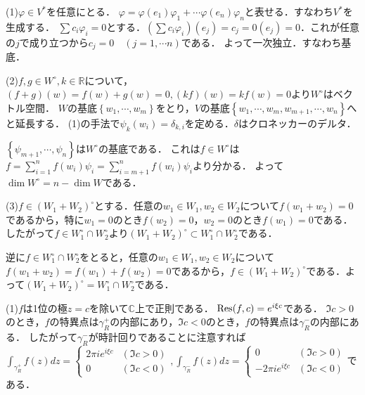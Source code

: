 \documentclass[
		book,
		head_space=20mm,
		foot_space=20mm,
		gutter=10mm,
		line_length=190mm
]{jlreq}
\begin{document}
(1)$\varphi\in V^*$を任意にとる．
$\varphi=\varphi(e_1)\varphi_1+\cdots \varphi(e_n)\varphi_n$と表せる．すなわち$V^*$を生成する．
$\sum c_i \varphi_i=0$とする．$(\sum c_i\varphi_i)(e_j)=c_j=0(e_j)=0$．これが任意の$j$で成り立つから$c_j=0\quad(j=1,\cdots n)$である．
よって一次独立．すなわち基底．

(2)$f,g\in W^{\circ},k\in \mathbb{R}$について，$(f+g)(w)=f(w)+g(w)=0,(kf)(w)=kf(w)=0$より$W^{\circ}$はベクトル空間．
$W$の基底$\left\{ w_1,\cdots,w_m \right\}$をとり，$V$の基底$\left\{ w_1,\cdots,w_m,w_{m+1},\cdots,w_n \right\}$へと延長する．
(1)の手法で$\psi_k(w_i)=\delta_{k,i}$を定める．$\delta$はクロネッカーのデルタ．

$\left\{ \psi_{m+1},\cdots,\psi_n \right\}$は$W^{\circ}$の基底である．
これは$f\in W^{\circ}$は$f=\sum\limits_{i=1}^n f(w_i)\psi_i=\sum\limits_{i=m+1}^n f(w_i)\psi_i$より分かる．
よって$\dim W^{\circ}=n-\dim W$である．

(3)$f\in (W_1+W_2)^{\circ}$とする．任意の$w_1\in W_1,w_2\in W_2$について$f(w_1+w_2)=0$であるから，特に$w_1=0$のとき$f(w_2)=0$，$w_2=0$のとき$f(w_1)=0$である．
したがって$f\in W_1^{\circ}\cap W_2^{\circ}$より$(W_1+W_2)^{\circ}\subset W_1^{\circ}\cap W_2^{\circ}$である．

逆に$f\in W_1^{\circ}\cap W_2^{\circ}$をとると，任意の$w_1\in W_1,w_2\in W_2$について$f(w_1+w_2)=f(w_1)+f(w_2)=0$であるから，$f\in (W_1+W_2)^{\circ}$である．よって$(W_1+W_2)^{\circ}= W_1^{\circ}\cap W_2^{\circ}$である．

(1)$f$は1位の極$z=c$を除いて$\mathbb{C}$上で正則である．
$\Res(f,c)=e^{i\xi c}$である．
$\Im c>0$のとき，$f$の特異点は$\gamma_R^+$の内部にあり，$\Im c<0$のとき，$f$の特異点は$\gamma_R^-$の内部にある．
したがって$\gamma_R^-$が時計回りであることに注意すれば$\int_{\gamma_R^+}f(z)dz=\begin{cases}
	2\pi i e^{i\xi c}&(\Im c>0)\\
	0&(\Im c<0)
\end{cases},\int_{\gamma_R^-}f(z)dz=\begin{cases}
	0&(\Im c>0)\\
	-2\pi i e^{i\xi c}&(\Im c<0)
\end{cases}$である．
\end{document}
